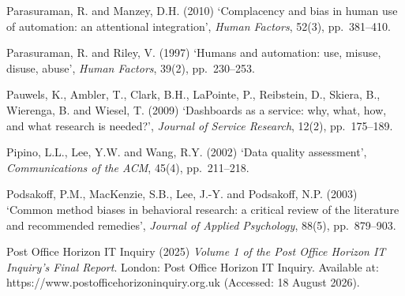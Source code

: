 \documentclass[11pt,a4paper]{article}
\numberwithin{figure}{section}
\numberwithin{table}{section}
\begin{document}
{\noindent\hypertarget{ref49}{}\begin{minipage}[t]{\dimexpr\linewidth-1.05cm\relax}Parasuraman, R. and Manzey, D.H. (2010) `Complacency and bias in human use of automation: an attentional integration', \emph{Human Factors}, 52(3), pp.~381--410.\end{minipage}\par\vspace{4pt}
\noindent\hypertarget{ref50}{}\begin{minipage}[t]{\dimexpr\linewidth-1.05cm\relax}Parasuraman, R. and Riley, V. (1997) `Humans and automation: use, misuse, disuse, abuse', \emph{Human Factors}, 39(2), pp.~230--253.\end{minipage}\par\vspace{4pt}
\noindent\hypertarget{ref51}{}\begin{minipage}[t]{\dimexpr\linewidth-1.05cm\relax}Pauwels, K., Ambler, T., Clark, B.H., LaPointe, P., Reibstein, D., Skiera, B., Wierenga, B. and Wiesel, T. (2009) `Dashboards as a service: why, what, how, and what research is needed?', \emph{Journal of Service Research}, 12(2), pp.~175--189.\end{minipage}\par\vspace{4pt}
\noindent\hypertarget{ref52}{}\begin{minipage}[t]{\dimexpr\linewidth-1.05cm\relax}Pipino, L.L., Lee, Y.W. and Wang, R.Y. (2002) `Data quality assessment', \emph{Communications of the ACM}, 45(4), pp.~211--218.\end{minipage}\par\vspace{4pt}
\noindent\hypertarget{ref53}{}\begin{minipage}[t]{\dimexpr\linewidth-1.05cm\relax}Podsakoff, P.M., MacKenzie, S.B., Lee, J.-Y. and Podsakoff, N.P. (2003) `Common method biases in behavioral research: a critical review of the literature and recommended remedies', \emph{Journal of Applied Psychology}, 88(5), pp.~879--903.\end{minipage}\par\vspace{4pt}
\noindent\hypertarget{ref54}{}\begin{minipage}[t]{\dimexpr\linewidth-1.05cm\relax}Post Office Horizon IT Inquiry (2025) \emph{Volume 1 of the Post Office Horizon IT Inquiry's Final Report}. London: Post Office Horizon IT Inquiry. Available at: https://www.postofficehorizoninquiry.org.uk (Accessed: 18 August 2026).\end{minipage}\par\vspace{4pt}
}
\end{document}
